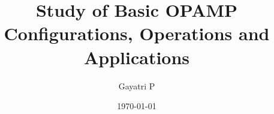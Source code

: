 \documentclass[reprint,amsmath,amssymb,aps]{revtex4-2}
\begin{document}
    \title{Study of Basic OPAMP Configurations, Operations and Applications}

    \author{Gayatri P}
    \date{\today}

    
    \maketitle

    
    
    
    

    \appendix

    

    
    \nocite{*}
\end{document}
